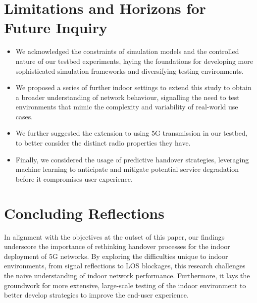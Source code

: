 \section{Limitations and Horizons for Future Inquiry}
\begin{itemize}
    \item We acknowledged the constraints of simulation models and the controlled nature of our testbed experiments, laying the foundations for developing more sophisticated simulation frameworks and diversifying testing environments.
    \item We proposed a series of further indoor settings to extend this study to obtain a broader understanding of network behaviour, signalling the need to test environments that mimic the complexity and variability of real-world use cases.
    \item We further suggested the extension to using 5G transmission in our testbed, to better consider the distinct radio properties they have.
    \item Finally, we considered the usage of predictive handover strategies, leveraging machine learning to anticipate and mitigate potential service degradation before it compromises user experience.
\end{itemize}

\section{Concluding Reflections}
In alignment with the objectives at the outset of this paper, our findings underscore the importance of rethinking handover processes for the indoor deployment of 5G networks. By exploring the difficulties unique to indoor environments, from signal reflections to LOS blockages, this research challenges the naive understanding of indoor network performance. Furthermore, it lays the groundwork for more extensive, large-scale testing of the indoor environment to better develop strategies to improve the end-user experience.%
